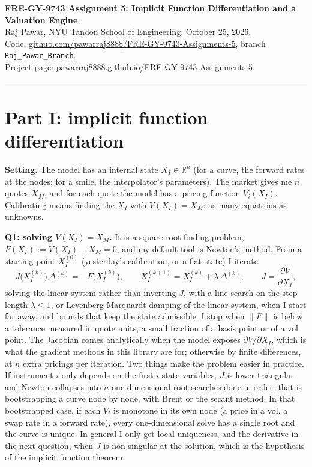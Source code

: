 \documentclass[10pt]{article}
\newcommand{\code}[1]{\texttt{#1}}
\begin{document}
{\Large\bfseries FRE-GY-9743 Assignment 5: Implicit Function Differentiation and a Valuation Engine}\\[1pt]
Raj Pawar, NYU Tandon School of Engineering, October 25, 2026.\\
Code: \href{https://github.com/pawarraj8888/FRE-GY-9743-Assignments-5/tree/Raj_Pawar_Branch}{github.com/pawarraj8888/FRE-GY-9743-Assignments-5}, branch \code{Raj\_Pawar\_Branch}.\\
Project page: \href{https://pawarraj8888.github.io/FRE-GY-9743-Assignments-5/}{pawarraj8888.github.io/FRE-GY-9743-Assignments-5}.
\vspace{2pt}\hrule

\section*{Part I: implicit function differentiation}
\textbf{Setting.} The model has an internal state $X_I\in\mathbb{R}^n$ (for a curve, the forward rates at the nodes; for a smile, the
interpolator's parameters). The market gives me $n$ quotes $X_M$, and for each quote the model has a pricing function $V_i(X_I)$.
Calibrating means finding the $X_I$ with $V(X_I)=X_M$: as many equations as unknowns.

\textbf{Q1: solving $V(X_I)=X_M$.} It is a square root-finding problem, $F(X_I):=V(X_I)-X_M=0$, and my default tool is Newton's method.
From a starting point $X_I^{(0)}$ (yesterday's calibration, or a flat state) I iterate
\[
J\bigl(X_I^{(k)}\bigr)\,\Delta^{(k)} = -F\bigl(X_I^{(k)}\bigr),\qquad X_I^{(k+1)}=X_I^{(k)}+\lambda\,\Delta^{(k)},\qquad
J=\frac{\partial V}{\partial X_I},
\]
solving the linear system rather than inverting $J$, with a line search on the step length $\lambda\le1$, or Levenberg-Marquardt
damping of the linear system, when I start far away, and bounds that keep the state admissible. I stop when $\|F\|$ is below a tolerance measured in quote units, a
small fraction of a basis point or of a vol point. The Jacobian comes analytically when the model exposes $\partial V/\partial X_I$,
which is what the gradient methods in this library are for; otherwise by finite differences, at $n$ extra pricings per iteration.
Two things make the problem easier in practice. If instrument $i$ only depends on the first $i$ state variables, $J$ is lower
triangular and Newton collapses into $n$ one-dimensional root searches done in order: that is bootstrapping a curve node by node, with
Brent or the secant method. In that bootstrapped case, if each $V_i$ is monotone in its own node (a price in a vol, a swap rate in a
forward rate), every one-dimensional solve has a single root and the curve is unique. In general I only get local uniqueness, and the
derivative in the next question, when $J$ is non-singular at the solution, which is the hypothesis of the implicit function theorem.
\end{document}
